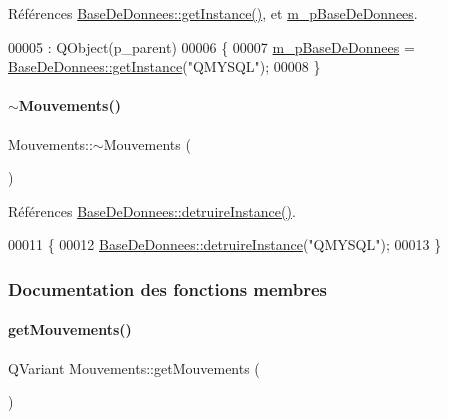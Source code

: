 Références \hyperlink{class_base_de_donnees_a80028aa2b6b4fbf30fb2e36357b7d3d3}{Base\+De\+Donnees\+::get\+Instance()}, et \hyperlink{class_mouvements_a8cb8047917f2e94adf9798c40b618d31}{m\+\_\+p\+Base\+De\+Donnees}.


\begin{DoxyCode}
00005                                         : QObject(p\_parent)
00006 \{
00007     \hyperlink{class_mouvements_a8cb8047917f2e94adf9798c40b618d31}{m\_pBaseDeDonnees} = \hyperlink{class_base_de_donnees_a80028aa2b6b4fbf30fb2e36357b7d3d3}{BaseDeDonnees::getInstance}(\textcolor{stringliteral}{"QMYSQL"});
00008 \}
\end{DoxyCode}
\mbox{\label{class_mouvements_a89683efbe6894fe23d05c0a7bd6e5d23}} 
\paragraph{\texorpdfstring{$\sim$\+Mouvements()}{~Mouvements()}}
{\footnotesize\ttfamily Mouvements\+::$\sim$\+Mouvements (\begin{DoxyParamCaption}{ }\end{DoxyParamCaption})}



Références \hyperlink{class_base_de_donnees_a457401c0816b888c77ce915997545f4e}{Base\+De\+Donnees\+::detruire\+Instance()}.


\begin{DoxyCode}
00011 \{
00012     \hyperlink{class_base_de_donnees_a457401c0816b888c77ce915997545f4e}{BaseDeDonnees::detruireInstance}(\textcolor{stringliteral}{"QMYSQL"});
00013 \}
\end{DoxyCode}


\subsubsection{Documentation des fonctions membres}
\mbox{\label{class_mouvements_a3ab449208a00af567cc5f638d12b98ef}} 
\paragraph{\texorpdfstring{get\+Mouvements()}{getMouvements()}}
{\footnotesize\ttfamily Q\+Variant Mouvements\+::get\+Mouvements (\begin{DoxyParamCaption}{ }\end{DoxyParamCaption})}




